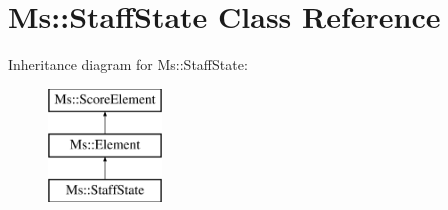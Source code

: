\hypertarget{class_ms_1_1_staff_state}{}\section{Ms\+:\+:Staff\+State Class Reference}
\label{class_ms_1_1_staff_state}
Inheritance diagram for Ms\+:\+:Staff\+State\+:\begin{figure}[H]
\begin{center}
\leavevmode
\includegraphics[height=3.000000cm]{class_ms_1_1_staff_state}
\end{center}
\end{figure}
